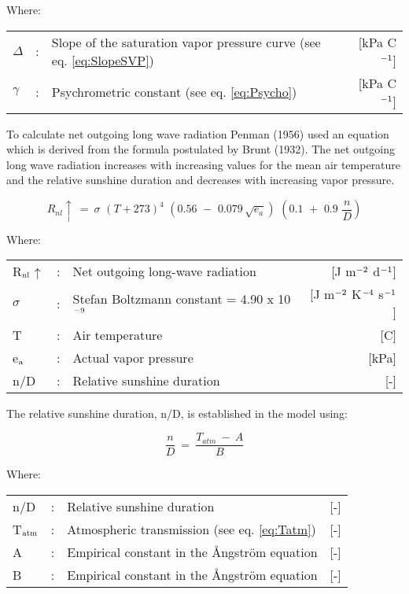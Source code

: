 Where:\\[5pt]
\begin{tabularx}{\textwidth}{llXr}
	$\Delta$ &:& Slope of the saturation vapor pressure curve (see eq. \ref{eq:SlopeSVP})  & [kPa \textdegree C$^{{\rm -1}}$]\\
	$\gamma$ &:& Psychrometric constant (see eq. \ref{eq:Psycho})  & [kPa \degrees C$^{{\rm -1}}$]
\end{tabularx}

To calculate net outgoing long wave radiation Penman (1956) used an equation which is
derived from the formula postulated by Brunt (1932). The net outgoing long wave
radiation increases with increasing values for the mean air temperature and the relative
sunshine duration and decreases with increasing vapor pressure.

\begin{equation}
R _{nl} \uparrow  ~=~ \sigma \,\, (T+273) ^{4} \,\, (0.56\,\, -\,\, 0.079\, \sqrt{e _{a} } )\,\, (0.1\,\, +\,\, 0.9\,\,{\frac{n}{D}} )
\end{equation}


Where:\\[5pt]
\begin{tabularx}{\textwidth}{llXr}
	R$_{{\rm nl}}$$\uparrow$ &:& Net outgoing long-wave radiation & [J m$^{{\rm -2}}$ d$^{{\rm -1}}$]\\
	$\sigma$ &:& Stefan Boltzm\-ann constant = 4.90 x 10$^{{\rm -9}}$ & [J m$^{{\rm -2}}$ K$^{{\rm -4}}$ s$^{{\rm -1}}$]\\
	T &:& Air temperature & [\textdegree C]\\
	e$_{{\rm a}}$ &:& Actual vapor pressure & [kPa]\\
	n/D &:& Relative sunshine duration & [-]\\
\end{tabularx}

The relative sunshine duration, n/D, is established in the model using:

\begin{equation}
{\frac{n}{D}} ~=~{\frac{T_{atm} ~-~A}{B}}
\end{equation}

Where:\\[5pt]
\begin{tabularx}{\textwidth}{llXr}
	n/D &:& Relative sunshine duration  & [-]\\
	T$_{{\rm atm}}$ &:& Atmospheric transmission (see eq. \ref{eq:Tatm})  & [-]\\
	A &:& Empirical constant in the \AA ngstr\"{o}m equation  & [-]\\
	B &:& Empirical constant in the \AA ngstr\"{o}m equation  & [-]\\
\end{tabularx}


